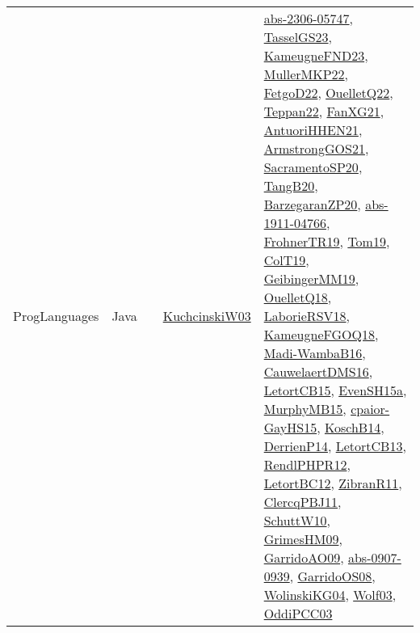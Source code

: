{\begin{longtable}{lp{3cm}>{\raggedright}p{6cm}>{\raggedright}p{6cm}p{8cm}}
ProgLanguages & Java &  & \href{articles/KuchcinskiW03.pdf}{KuchcinskiW03}\cite{KuchcinskiW03} & \href{articles/abs-2306-05747.pdf}{abs-2306-05747}\cite{abs-2306-05747}, \href{papers/TasselGS23.pdf}{TasselGS23}\cite{TasselGS23}, \href{papers/KameugneFND23.pdf}{KameugneFND23}\cite{KameugneFND23}, \href{articles/MullerMKP22.pdf}{MullerMKP22}\cite{MullerMKP22}, \href{articles/FetgoD22.pdf}{FetgoD22}\cite{FetgoD22}, \href{papers/OuelletQ22.pdf}{OuelletQ22}\cite{OuelletQ22}, \href{papers/Teppan22.pdf}{Teppan22}\cite{Teppan22}, \href{articles/FanXG21.pdf}{FanXG21}\cite{FanXG21}, \href{papers/AntuoriHHEN21.pdf}{AntuoriHHEN21}\cite{AntuoriHHEN21}, \href{papers/ArmstrongGOS21.pdf}{ArmstrongGOS21}\cite{ArmstrongGOS21}, \href{articles/SacramentoSP20.pdf}{SacramentoSP20}\cite{SacramentoSP20}, \href{papers/TangB20.pdf}{TangB20}\cite{TangB20}, \href{papers/BarzegaranZP20.pdf}{BarzegaranZP20}\cite{BarzegaranZP20}, \href{articles/abs-1911-04766.pdf}{abs-1911-04766}\cite{abs-1911-04766}, \href{papers/FrohnerTR19.pdf}{FrohnerTR19}\cite{FrohnerTR19}, \href{papers/Tom19.pdf}{Tom19}\cite{Tom19}, \href{papers/ColT19.pdf}{ColT19}\cite{ColT19}, \href{papers/GeibingerMM19.pdf}{GeibingerMM19}\cite{GeibingerMM19}, \href{papers/OuelletQ18.pdf}{OuelletQ18}\cite{OuelletQ18}, \href{articles/LaborieRSV18.pdf}{LaborieRSV18}\cite{LaborieRSV18}, \href{papers/KameugneFGOQ18.pdf}{KameugneFGOQ18}\cite{KameugneFGOQ18}, \href{papers/Madi-WambaB16.pdf}{Madi-WambaB16}\cite{Madi-WambaB16}, \href{papers/CauwelaertDMS16.pdf}{CauwelaertDMS16}\cite{CauwelaertDMS16}, \href{articles/LetortCB15.pdf}{LetortCB15}\cite{LetortCB15}, \href{articles/EvenSH15a.pdf}{EvenSH15a}\cite{EvenSH15a}, \href{papers/MurphyMB15.pdf}{MurphyMB15}\cite{MurphyMB15}, \href{papers/cpaior-GayHS15.pdf}{cpaior-GayHS15}\cite{cpaior-GayHS15}, \href{papers/KoschB14.pdf}{KoschB14}\cite{KoschB14}, \href{papers/DerrienP14.pdf}{DerrienP14}\cite{DerrienP14}, \href{papers/LetortCB13.pdf}{LetortCB13}\cite{LetortCB13}, \href{papers/RendlPHPR12.pdf}{RendlPHPR12}\cite{RendlPHPR12}, \href{papers/LetortBC12.pdf}{LetortBC12}\cite{LetortBC12}, \href{papers/ZibranR11.pdf}{ZibranR11}\cite{ZibranR11}, \href{papers/ClercqPBJ11.pdf}{ClercqPBJ11}\cite{ClercqPBJ11}, \href{papers/SchuttW10.pdf}{SchuttW10}\cite{SchuttW10}, \href{papers/GrimesHM09.pdf}{GrimesHM09}\cite{GrimesHM09}, \href{articles/GarridoAO09.pdf}{GarridoAO09}\cite{GarridoAO09}, \href{articles/abs-0907-0939.pdf}{abs-0907-0939}\cite{abs-0907-0939}, \href{articles/GarridoOS08.pdf}{GarridoOS08}\cite{GarridoOS08}, \href{papers/WolinskiKG04.pdf}{WolinskiKG04}\cite{WolinskiKG04}, \href{papers/Wolf03.pdf}{Wolf03}\cite{Wolf03}, \href{papers/OddiPCC03.pdf}{OddiPCC03}\cite{OddiPCC03}\\

\end{longtable}}
